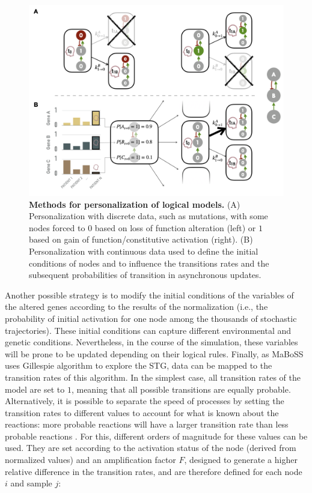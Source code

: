 \documentclass[a4paper,12pt,twoside,onecolumn,openright,final,oldfontcommands]{memoir}
\begin{document}
\begin{figure}

{\centering \includegraphics[width=0.9\linewidth]{fig/logical-personalization} 

}

\caption[Methods for personalization of logical models]{\textbf{Methods for
personalization of logical models.} (A) Personalization with discrete
data, such as mutations, with some nodes forced to \(0\) based on loss
of function alteration (left) or \(1\) based on gain of
function/constitutive activation (right). (B) Personalization with
continuous data used to define the initial conditions of nodes and to
influence the transitions rates and the subsequent probabilities of
transition in asynchronous updates.}\label{fig:logical-personalization}
\end{figure}










Another possible strategy is to modify the initial conditions of the
variables of the altered genes according to the results of the
normalization (i.e., the probability of initial activation for one node
among the thousands of stochastic trajectories). These initial
conditions can capture different environmental and genetic conditions.
Nevertheless, in the course of the simulation, these variables will be
prone to be updated depending on their logical rules. Finally, as MaBoSS
uses Gillespie algorithm to explore the STG, data can be mapped to the
transition rates of this algorithm. In the simplest case, all transition
rates of the model are set to \(1\), meaning that all possible
transitions are equally probable. Alternatively, it is possible to
separate the speed of processes by setting the transition rates to
different values to account for what is known about the reactions: more
probable reactions will have a larger transition rate than less probable
reactions \citep{stoll2012continuous}. For this, different orders of
magnitude for these values can be used. They are set according to the
activation status of the node (derived from normalized values) and an
amplification factor \(F\), designed to generate a higher relative
difference in the transition rates, and are therefore defined for each
node \(i\) and sample \(j\):
\end{document}
